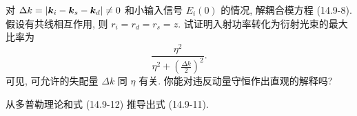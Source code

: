 \documentclass{note}
\begin{document}
\begin{exe}
    对 $\Delta k=\left\lvert\bm{k}_i-\bm{k}_s-\bm{k}_d\right\rvert\neq 0$ 和小输入信号 $E_i(0)$ 的情况, 解耦合模方程 (14.9-8). 假设有共线相互作用, 则 $r_i=r_d=r_s=z$. 试证明入射功率转化为衍射光束的最大比率为
    \[
        \frac{\eta^2}{\eta^2+\left(\frac{\Delta k}{2}\right)^2}.
    \]
    可见, 可允许的失配量 $\Delta k$ 同 $\eta$ 有关. 你能对违反动量守恒作出直观的解释吗?
\end{exe}
\begin{pf}
    
\end{pf}

\begin{exe}
    从多普勒理论和式 (14.9-12) 推导出式 (14.9-11).
\end{exe}
\begin{pf}
    
\end{pf}
\ifx\allfiles\undefined
\end{document}
